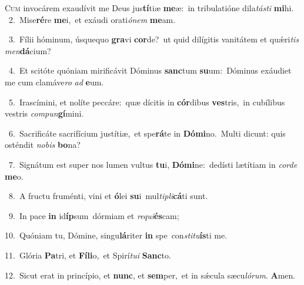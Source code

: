 \lettrine{\initial\textcolor{\initialcolor}{C}}{um} invocárem exaudívit me Deus jus\-\textbf{tí}\-tiæ \textbf{me}\-æ:~\star in tribulatióne dila\-\textit{tás}\-\textit{ti} \textbf{mi}\-hi.\\
{\numbfont\textcolor{\numbcolor}{~2.}}~Mise\-\textbf{ré}\-re \textbf{me}\-i,~\star et exáudi orati\-\textit{ó}\-\textit{nem} \textbf{me}\-am.\par
{\numbfont\textcolor{\numbcolor}{~3.}}~Fílii hóminum, úsquequo \textbf{gra}\-vi \textbf{cor}\-de?~\star ut quid dilígitis vanitátem et quǽri\textit{tis} \textit{men}\-\textbf{dá}cium?\par
{\numbfont\textcolor{\numbcolor}{~4.}}~Et scitóte quóniam mirificávit Dóminus \textbf{sanc}\-tum \textbf{su}\-um:~\star Dóminus exáudiet me cum clamáve\textit{ro} \textit{ad} \textbf{e}\-um.\par
{\numbfont\textcolor{\numbcolor}{~5.}}~Irascímini, et nolíte peccáre:~\dagger quæ dícitis in \textbf{cór}\-dibus \textbf{ves}\-tris,~\star in cubílibus vestris \textit{com}\-\textit{pun}\textbf{gí}mini.\par
{\numbfont\textcolor{\numbcolor}{~6.}}~Sacrificáte sacrifícium justítiæ,~\dagger et spe\-\textbf{rá}\-te in \textbf{Dó}\-\textbf{mi}no.~\star Multi dicunt: quis osténdit \textit{no}\-\textit{bis} \textbf{bo}\-na?\par
{\numbfont\textcolor{\numbcolor}{~7.}}~Signátum est super nos lumen vultus \textbf{tu}\-i, \textbf{Dó}\-\textbf{mi}ne:~\star dedísti lætítiam in \textit{cor}\-\textit{de} \textbf{me}\-o.\par
{\numbfont\textcolor{\numbcolor}{~8.}}~A fructu fruménti, vini et \textbf{ó}\-lei \textbf{su}\-i~\star mul\-\textit{ti}\-\textit{pli}\textbf{cá}ti sunt.\par
{\numbfont\textcolor{\numbcolor}{~9.}}~In pace \textbf{in} id\-\textbf{íp}\-sum~\star dórmiam et \textit{re}\-\textit{qui}\textbf{és}cam;\par
{\numbfont\textcolor{\numbcolor}{10.}}~Quóniam tu, Dómine, singu\-\textbf{lá}\-riter \textbf{in} spe~\star con\-\textit{sti}\-\textit{tu}\textbf{ís}ti me.\par
{\numbfont\textcolor{\numbcolor}{11.}}~Glória \textbf{Pa}\-tri, et \textbf{Fí}\-\textbf{li}o,~\star et Spirí\-\textit{tu}\-\textit{i} \textbf{Sanc}\-to.\par
{\numbfont\textcolor{\numbcolor}{12.}}~Sicut erat in princípio, et \textbf{nunc}\-, et \textbf{sem}\-per,~\star et in sǽcula sæcu\-\textit{ló}\-\textit{rum}. \textbf{A}\-men.\par
